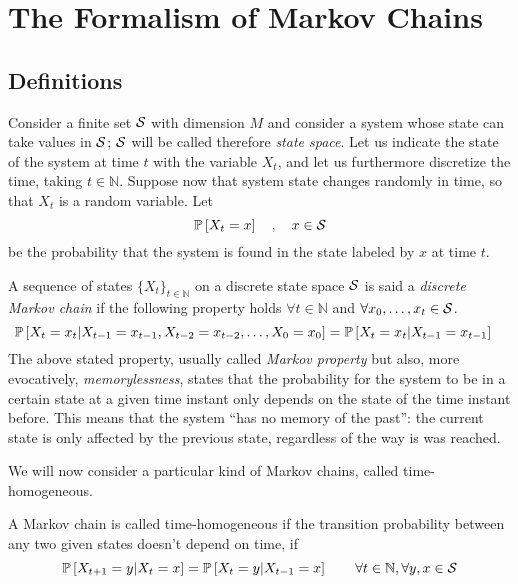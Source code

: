 \chapter{The Formalism of Markov Chains}
\label{ch:markov_chains}
\section{Definitions}
Consider a finite set $\mathcal{S}$ with dimension $M$ and consider a system whose state can take values in $\mathcal{S}$; $\mathcal{S}$ will be called therefore \emph{state space}. Let us indicate the state of the system at time $t$ with the variable $X_t$, and let us furthermore discretize the time, taking $t \in \mathbb{N}$. Suppose now that system state changes randomly in time, so that $X_t$ is a random variable. Let
\begin{equation}
    \mathbb{P}\left[X_t = x\right] \quad , \quad x \in \mathcal{S}
\end{equation}
be the probability that the system is found in the state labeled by $x$ at time $t$.

\begin{ndef}  \label{def:markov-chain}
    A sequence of states $\{X_t\}_{t\in \mathbb{N}}$ on a discrete state space $\mathcal{S}$ is said a \emph{discrete Markov chain} if the following property holds $\forall t \in \mathbb N$ and $\forall x_0, \dots, x_t \in \mathcal{S}$.
    \begin{equation}
        \mathbb{P}\left[ X_t = x_t | X_{t-1} = x_{t-1}, X_{t-2} = x_{t-2}, \dots, X_0 = x_0 \right] = \mathbb{P}\left[ X_t = x_t | X_{t-1} = x_{t-1} \right] \quad
    \end{equation}
The above stated property, usually called \emph{Markov property} but also, more evocatively, \emph{memorylessness}, states that the probability for the system to be in a certain state at a given time instant only depends on the state of the time instant before. This means that the system \enquote{has no memory of the past}: the current state is only affected by the previous state, regardless of the way is was reached.
\end{ndef}

We will now consider a particular kind of Markov chains, called time-homogeneous.
\begin{ndef}  A Markov chain is called time-homogeneous if the transition probability between any two given states doesn't depend on time, \ie if
    \begin{equation}
        \mathbb{P}\left[X_{t+1} = y | X_{t} = x\right] = \mathbb{P}\left[X_{t} = y | X_{t-1} = x\right] \quad \quad \forall t\in \mathbb{N}, \forall y, x \in \mathcal{S}
    \end{equation}
\end{ndef}


